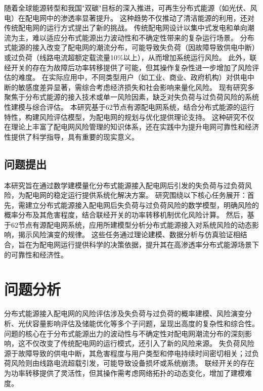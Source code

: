 \documentclass{article}
\begin{document}
随着全球能源转型和我国"双碳"目标的深入推进，可再生分布式能源（如光伏、风电）在配电网中的渗透率显著提升。
这种趋势不仅推动了清洁能源的利用，还对传统配电网的运行方式提出了新的挑战。
传统配电网设计以集中式发电和单向潮流为主，难以适应分布式能源出力波动性和不确定性带来的复杂运行场景。
分布式能源的接入改变了配电网的潮流分布，可能导致失负荷（因故障导致供电中断）或过负荷（线路电流超额定载流量10\%以上），从而增加系统运行风险。
此外，联经开关的存在为故障后功率转移提供了可能，但其操作复杂性进一步增加了风险评估的难度。
在实际应用中，不同类型用户（如工业、商业、政府机构）对供电中断的敏感度差异显著，需综合考虑经济损失和社会影响来量化风险。
现有研究多聚焦于分布式能源的接入技术或单一风险因素，缺乏对失负荷与过负荷风险的系统性建模与综合评估。
本研究基于62节点有源配电网系统，结合分布式能源的运行特性，构建风险评估模型，为配电网的规划与优化提供理论支持。
这种研究不仅在理论上丰富了配电网风险管理的知识体系，还在实践中为提升电网可靠性和经济性提供了科学指导，具有重要的现实意义。

\subsection{问题提出}\label{sec:problem_proposed}

本研究旨在通过数学建模量化分布式能源接入配电网后引发的失负荷与过负荷风险，为配电网的稳定运行提供系统化解决方案。
研究围绕以下核心任务展开：首先，需建立分布式能源接入配电网后失负荷与过负荷风险的数学模型，明确风险的概率分布及其危害程度，结合联经开关的功率转移机制优化风险计算。
然后，基于62节点有源配电网系统，应用所建模型分析分布式能源接入对系统风险的动态影响，揭示风险演变的规律。
这些任务通过理论建模、数据分析与仿真验证相结合，旨在为配电网运行提供科学的决策依据，提升其在高渗透率分布式能源场景下的可靠性和经济性。

\section{问题分析}\label{sec:analysis}

分布式能源接入配电网的风险评估涉及失负荷与过负荷的概率建模、风险演变分析、光伏容量影响评估及储能优化等多个子问题，呈现出高度的复杂性和综合性。
问题的核心在于分布式能源出力的波动性与不确定性对配电网潮流分布的深刻影响，这不仅改变了传统配电网的运行模式，还引入了新的风险来源。
失负荷风险源于故障导致的供电中断，其危害程度与用户类型和停电持续时间密切相关；过负荷风险则由线路电流超载引发，可能导致设备损坏或系统崩溃。
联经开关的存在为功率转移提供了灵活性，但其操作需考虑网络拓扑的动态变化，增加了建模难度。
\end{document}
